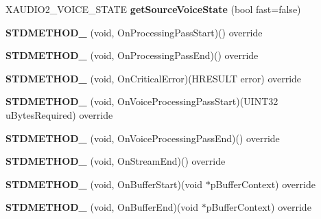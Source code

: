 \begin{DoxyCompactItemize}
X\+A\+U\+D\+I\+O2\+\_\+\+V\+O\+I\+C\+E\+\_\+\+S\+T\+A\+TE {\bfseries get\+Source\+Voice\+State} (bool fast=false)
\item 
\mbox{\label{classexperimental_1_1AudioPlayer_a7af1db2fe701250c8859557e967b1cb7}} 
{\bfseries S\+T\+D\+M\+E\+T\+H\+O\+D\+\_\+} (void, On\+Processing\+Pass\+Start)() override
\item 
\mbox{\label{classexperimental_1_1AudioPlayer_a38427dd0f09e9105752137f17373952c}} 
{\bfseries S\+T\+D\+M\+E\+T\+H\+O\+D\+\_\+} (void, On\+Processing\+Pass\+End)() override
\item 
\mbox{\label{classexperimental_1_1AudioPlayer_ad86be9c7d73bc1db493d5517836201c6}} 
{\bfseries S\+T\+D\+M\+E\+T\+H\+O\+D\+\_\+} (void, On\+Critical\+Error)(H\+R\+E\+S\+U\+LT error) override
\item 
\mbox{\label{classexperimental_1_1AudioPlayer_ab2e4a4506605185493e6c4f429e08f6e}} 
{\bfseries S\+T\+D\+M\+E\+T\+H\+O\+D\+\_\+} (void, On\+Voice\+Processing\+Pass\+Start)(U\+I\+N\+T32 u\+Bytes\+Required) override
\item 
\mbox{\label{classexperimental_1_1AudioPlayer_a3227be7b917885b22884c3eda0aadb0b}} 
{\bfseries S\+T\+D\+M\+E\+T\+H\+O\+D\+\_\+} (void, On\+Voice\+Processing\+Pass\+End)() override
\item 
\mbox{\label{classexperimental_1_1AudioPlayer_a07615bfee2c35a30c02884a86ffd8e24}} 
{\bfseries S\+T\+D\+M\+E\+T\+H\+O\+D\+\_\+} (void, On\+Stream\+End)() override
\item 
\mbox{\label{classexperimental_1_1AudioPlayer_a672ca51643c3c97bec6817921d085610}} 
{\bfseries S\+T\+D\+M\+E\+T\+H\+O\+D\+\_\+} (void, On\+Buffer\+Start)(void $\ast$p\+Buffer\+Context) override
\item 
\mbox{\label{classexperimental_1_1AudioPlayer_a0af61257ab48c94502805d195c1ea3ef}} 
{\bfseries S\+T\+D\+M\+E\+T\+H\+O\+D\+\_\+} (void, On\+Buffer\+End)(void $\ast$p\+Buffer\+Context) override

\end{DoxyCompactItemize}
